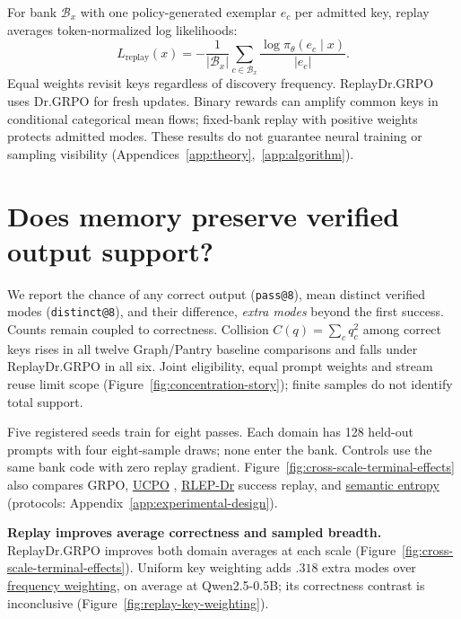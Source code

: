 For bank $\mathcal B_x$ with one policy-generated exemplar $e_c$ per admitted
key, replay averages token-normalized log likelihoods:
\begin{equation}
L_{\mathrm{replay}}(x)=-\frac{1}{|\mathcal B_x|}
\sum_{c\in\mathcal B_x}\frac{\log\pi_\theta(e_c\mid x)}{|e_c|}.
\label{eq:lm-verified-replay}
\end{equation}
Equal weights revisit keys regardless of discovery frequency. ReplayDr.GRPO
uses Dr.GRPO \citep{liu2025understanding} for fresh updates. Binary rewards can amplify common keys in conditional categorical mean flows;
fixed-bank replay with positive weights protects admitted modes.
These results do not guarantee neural training or sampling visibility
(Appendices~\ref{app:theory},~\ref{app:algorithm}).

\section{Does memory preserve verified output support?}
\label{sec:experiments}\label{sec:results}
We report the chance of any correct output (\texttt{pass@8}), mean distinct
verified modes (\texttt{distinct@8}), and their difference, \emph{extra modes}
beyond the first success. Counts remain coupled to correctness. Collision $C(q)=\sum_c q_c^2$ among
correct keys rises in all twelve Graph/Pantry baseline comparisons and falls
under ReplayDr.GRPO in all six. Joint eligibility, equal prompt weights and
stream reuse limit scope (Figure~\ref{fig:concentration-story}); finite
samples do not identify total support.

Five registered seeds train for eight passes. Each domain has 128 held-out
prompts with four eight-sample draws; none enter the bank. Controls use the same
bank code with zero replay gradient. Figure~\ref{fig:cross-scale-terminal-effects}
also compares GRPO,
\href{https://huggingface.co/od2961/maxent-grpo-models/blob/main/EXPERIMENTS.md\#direct-comparators}{UCPO} \citep{lochab2026ucpo}, \href{https://huggingface.co/od2961/maxent-grpo-models/blob/main/EXPERIMENTS.md\#direct-comparators}{RLEP-Dr} success replay, and \href{https://huggingface.co/od2961/maxent-grpo-models/blob/main/EXPERIMENTS.md\#semantic-ablations}{semantic entropy}
(protocols: Appendix~\ref{app:experimental-design}).



\noindent\textbf{Replay improves average correctness and sampled breadth.}
\label{sec:results-retention}
ReplayDr.GRPO improves both domain averages at each scale
(Figure~\ref{fig:cross-scale-terminal-effects}).
Uniform key weighting adds $.318$ extra modes over \href{https://huggingface.co/od2961/maxent-grpo-models/blob/main/experiments/E120-R1/README.md\#models}{frequency weighting},
on average at Qwen2.5-0.5B; its correctness contrast is inconclusive
(Figure~\ref{fig:replay-key-weighting}).

